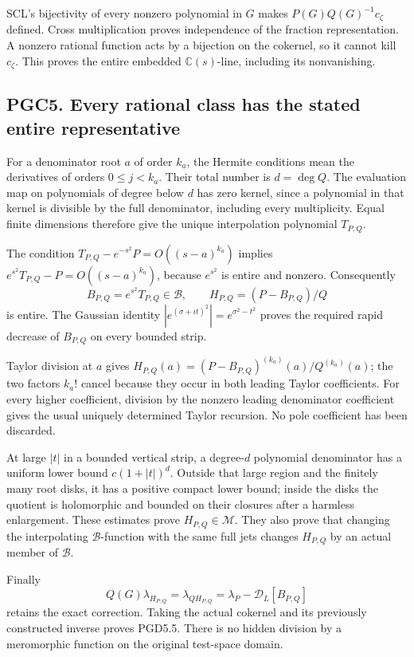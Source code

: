 SCL's bijectivity of every nonzero polynomial in \(G\) makes
\(P(G)Q(G)^{-1}c_\zeta\) defined. Cross multiplication proves
independence of the fraction representation. A nonzero rational function
acts by a bijection on the cokernel, so it cannot kill \(c_\zeta\). This
proves the entire embedded \(\mathbb C(s)\)-line, including its
nonvanishing.

\subsection{PGC5. Every rational class has the stated entire
representative}\label{pgc5.-every-rational-class-has-the-stated-entire-representative}

For a denominator root \(a\) of order \(k_a\), the Hermite conditions
mean the derivatives of orders \(0\le j<k_a\). Their total number is
\(d=\deg Q\). The evaluation map on polynomials of degree below \(d\)
has zero kernel, since a polynomial in that kernel is divisible by the
full denominator, including every multiplicity. Equal finite dimensions
therefore give the unique interpolation polynomial \(T_{P,Q}\).

The condition \(T_{P,Q}-e^{-s^2}P=O((s-a)^{k_a})\) implies
\(e^{s^2}T_{P,Q}-P=O((s-a)^{k_a})\), because \(e^{s^2}\) is entire and
nonzero. Consequently \[
 B_{P,Q}=e^{s^2}T_{P,Q}\in\mathcal B,\qquad
 H_{P,Q}=(P-B_{P,Q})/Q
\] is entire. The Gaussian identity
\(|e^{(\sigma+it)^2}|=e^{\sigma^2-t^2}\) proves the required rapid
decrease of \(B_{P,Q}\) on every bounded strip.

Taylor division at \(a\) gives
\(H_{P,Q}(a)=(P-B_{P,Q})^{(k_a)}(a)/Q^{(k_a)}(a)\); the two factors
\(k_a!\) cancel because they occur in both leading Taylor coefficients.
For every higher coefficient, division by the nonzero leading
denominator coefficient gives the usual uniquely determined Taylor
recursion. No pole coefficient has been discarded.

At large \(|t|\) in a bounded vertical strip, a degree-\(d\) polynomial
denominator has a uniform lower bound \(c(1+|t|)^d\). Outside that large
region and the finitely many root disks, it has a positive compact lower
bound; inside the disks the quotient is holomorphic and bounded on their
closures after a harmless enlargement. These estimates prove
\(H_{P,Q}\in\mathcal M\). They also prove that changing the
interpolating \(\mathcal B\)-function with the same full jets changes
\(H_{P,Q}\) by an actual member of \(\mathcal B\).

Finally \[
 Q(G)\lambda_{H_{P,Q}}
 =\lambda_{QH_{P,Q}}
 =\lambda_P-\mathcal D_L[B_{P,Q}]
\] retains the exact correction. Taking the actual cokernel and its
previously constructed inverse proves PGD5.5. There is no hidden
division by a meromorphic function on the original test-space domain.

